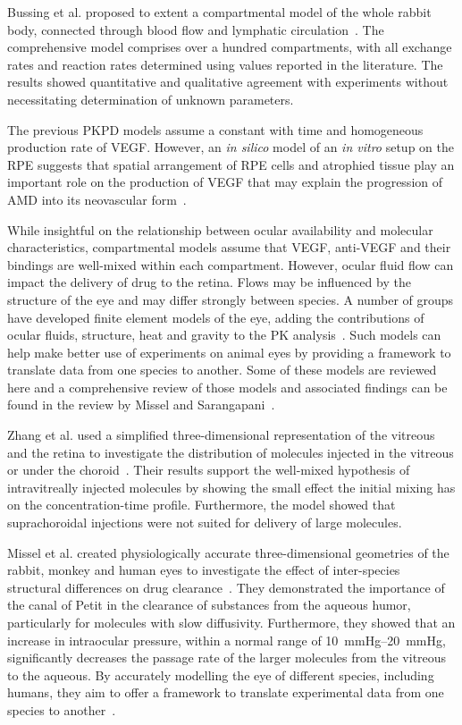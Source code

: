 \documentclass[12pt,a4paper]{journal}
\begin{document}
Bussing et al. proposed to extent a compartmental model of the whole rabbit body, connected through blood flow and lymphatic circulation~\cite{Bussing_2020}.
The comprehensive model comprises over a hundred compartments, with all exchange rates and reaction rates determined using values reported in the literature.
The results showed quantitative and qualitative agreement with experiments without necessitating determination of unknown parameters. 

The previous PKPD models assume a constant with time and homogeneous production rate of VEGF.
However, an \textit{in silico} model of an \textit{in vitro} setup on the RPE suggests that spatial arrangement of RPE cells and atrophied tissue play an important role on the production of VEGF that may explain the progression of AMD into its neovascular form~\cite{Baker_2017}.  

While insightful on the relationship between ocular availability and molecular characteristics, compartmental models assume that VEGF, anti-VEGF and their bindings are well-mixed within each compartment.
However, ocular fluid flow can impact the delivery of drug to the retina.
Flows may be influenced by the structure of the eye and may differ strongly between species.
A number of groups have developed finite element models of the eye, adding the contributions of ocular fluids, structure, heat and gravity to the PK analysis~\cite{Lamminsalo_2018, Missel_2012, Zhang_2018}.
Such models can help make better use of experiments on animal eyes by providing a framework to translate data from one species to another.
Some of these models are reviewed here and a comprehensive review of those models and associated findings can be found in the review by Missel and Sarangapani~\cite{Missel_2019}.

Zhang et al. used a simplified three-dimensional representation of the vitreous and the retina to investigate the distribution of molecules injected in the vitreous or under the choroid~\cite{Zhang_2018}.
Their results support the well-mixed hypothesis of intravitreally injected molecules by showing the small effect the initial mixing has on the concentration-time profile.
Furthermore, the model showed that suprachoroidal injections were not suited for delivery of large molecules.

Missel et al. created physiologically accurate three-dimensional geometries of the rabbit, monkey and human eyes to investigate the effect of inter-species structural differences on drug clearance~\cite{Missel_2012}.  
They demonstrated the importance of the canal of Petit in the clearance of substances from the aqueous humor, particularly for molecules with slow diffusivity. 
Furthermore, they showed that an increase in intraocular pressure, within a normal range of \SIrange[range-units = single]{10}{20}{\mmHg}, significantly decreases the passage rate of the larger molecules from the vitreous to the aqueous.
By accurately modelling the eye of different species, including humans, they aim to offer a framework to translate experimental data from one species to another~\cite{Missel_2012}.
\end{document}
